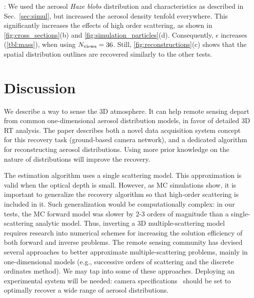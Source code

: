 \documentclass[10pt,letterpaper]{article}
\newcommand{\fix}[2]{\st{#1}\hl{#2}}
\begin{document}
: We used the aerosol {\em Haze blobs} distribution
and characteristics as described in Sec.~\ref{sec:simul}, but increased the
aerosol density tenfold everywhere. This significantly increases the effects
of high order scattering, as shown in \cref{fig:cross_sections}(b) and
\cref{fig:simulation_particles}(d). Consequently, $\epsilon$ increases (\cref{tbl:mass}),
when using $N_{\rm views}=36$. Still, \cref{fig:reconstructions}(c) shows
that the spatial distribution outlines are recovered similarly to the other
tests.


\section{Discussion}
\label{sec:conclusions}

We describe a way to sense the 3D atmosphere. It can help remote
sensing depart from common one-dimensional aerosol distribution models, in favor
of detailed 3D RT analysis.  The paper describes both a novel data
acquisition system concept for this recovery task (ground-based camera
network), and a dedicated algorithm for reconstructing aerosol
distributions. Using more prior knowledge on the nature of
distributions will improve the recovery.

The estimation algorithm
uses a single scattering model. This approximation is valid when the
optical depth is small. However, as MC simulations show, it is
important to generalize the recovery algorithm so that high-order scattering
is included in it. Such generalization would be computationally complex:
in our tests, the MC forward model was slower by 2-3 orders of magnitude
than a single-scattering analytic model. Thus, inverting a 3D multiple-scattering
model requires research into numerical schemes for increasing the solution
efficiency of both forward and inverse problems.
The remote sensing community has devised several approaches to better approximate
multiple-scattering problems, mainly in one-dimensional models (e.g., successive
orders of scattering and the discrete ordinates method). We may tap into some of these approaches.
Deploying an experimental system will be needed: camera specifications~\cite{Pust2011}
should be set to optimally recover a wide range of aerosol distributions.
\end{document}
